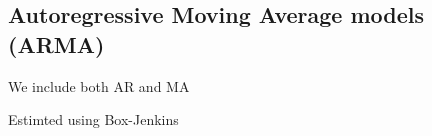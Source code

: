 
\subsection{Autoregressive Moving Average models (ARMA)}

We include both AR and MA

Estimted using Box-Jenkins

